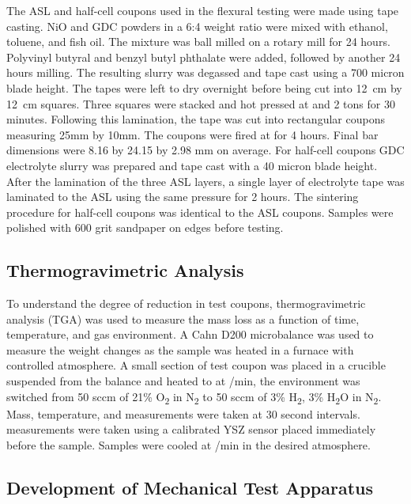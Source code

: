 The ASL and half-cell coupons used in the flexural testing were made using tape casting.
NiO and GDC powders in a 6:4 weight ratio were mixed with ethanol, toluene, and fish oil.
The mixture was ball milled on a rotary mill for 24 hours.
Polyvinyl butyral and benzyl butyl phthalate were added, followed by another 24 hours milling.
The resulting slurry was degassed and tape cast using a 700 micron blade height.
The tapes were left to dry overnight before being cut into \SI{12}{\centi\meter} by \SI{12}{\centi\meter} squares.
Three squares were stacked and hot pressed at  and 2 tons for 30 minutes.
Following this lamination, the tape was cut into rectangular coupons measuring 25mm by 10mm.
The coupons were fired at  for 4 hours.
Final bar dimensions were 8.16 by 24.15 by 2.98 mm on average.
For half-cell coupons GDC electrolyte slurry was prepared and tape cast with a 40 micron blade height.
After the lamination of the three ASL layers, a single layer of electrolyte tape was laminated to the ASL using the same pressure for 2 hours.
The sintering procedure for half-cell coupons was identical to the ASL coupons.
Samples were polished with 600 grit sandpaper on edges before testing.

\subsection{Thermogravimetric Analysis}

To understand the degree of reduction in test coupons, thermogravimetric analysis (TGA) was used to measure the mass loss as a function of time,
temperature, and gas environment.
A Cahn D200 microbalance was used to measure the weight changes as the sample was heated in a furnace with controlled atmosphere.
A small section of test coupon was placed in a crucible suspended from the balance and heated to  at /min, the environment was switched from 50 sccm of 21\% O\textsubscript{2} in
N\textsubscript{2} to 50 sccm of 3\% H\textsubscript{2}, 3\%
H\textsubscript{2}O in N\textsubscript{2}.
Mass, temperature, and
 measurements were taken at 30 second intervals.
 measurements were taken using a calibrated YSZ
sensor placed immediately before the sample.
Samples were cooled at
/min in the desired atmosphere.

\subsection{Development of Mechanical Test Apparatus}

